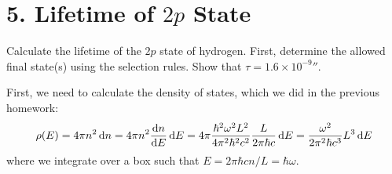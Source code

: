 \documentclass[a4paper,twoside]{article}
\begin{document}
\section*{5. Lifetime of $ 2p $ State}
Calculate the lifetime of the $ 2p $ state of hydrogen. First, determine the allowed final state(s) using the selection rules. Show that $ \tau = 1.6 \times 10^{-9} \second $.
\begin{problem}
    First, we need to calculate the density of states, which we did in the previous homework:
    \begin{equation}
        \rho(E) = 4 \pi n^2 \dd{n} = 4 \pi n^2 \dv{n}{E} \dd{E} = 4 \pi \frac{\hbar^2 \omega^2 L^2}{4 \pi^2 \hbar^2 c^2} \frac{L}{2 \pi \hbar c} \dd{E} = \frac{\omega^2}{2 \pi^2 \hbar c^3} L^3 \dd{E}
    \end{equation}
    where we integrate over a box such that $ E = 2 \pi \hbar c n / L = \hbar \omega $.


\end{problem}
\end{document}
